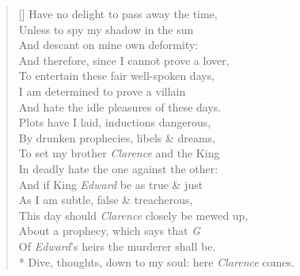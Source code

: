 \documentclass[MAIN]{subfiles}
\begin{document}
\begin{verse}[\versewidth]
Have no delight to pass away the time,\\
Unless to spy my shadow in the sun\\
And descant on mine own deformity:\\
And therefore, since I cannot prove a lover,\\
To entertain these fair well-spoken days,\\
I am determined to prove a villain\\
And hate the idle pleasures of these days.\\
Plots have I laid, inductions dangerous,\\
By drunken prophecies, libels \& dreams,\\
To set my brother \emph{Clarence} and the King\\
In deadly hate the one against the other:\\
And if King \emph{Edward} be as true \& just\\
As I am subtle, false \& treacherous,\\
This day should \emph{Clarence} closely be mewed up,\\
About a prophecy, which says that \emph{G}\\
Of \emph{Edward}'s heirs the murderer shall be.\\*
Dive, thoughts, down to my soul: here \emph{Clarence} comes.
\end{verse}
\end{document}
